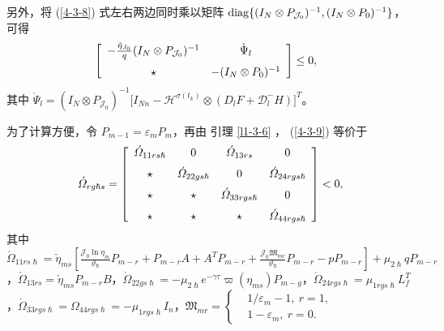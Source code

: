 另外，将 (\ref{4-3-8}) 式左右两边同时乘以矩阵 ${\rm diag}\{(I_N\otimes P_{\mathcal{J}_0})^{-1},(I_N\otimes P_0)^{-1}\}$，可得
\begin{align*}  
&\left[ \begin{array}{cc}
-\frac{\tilde{\eta}_{J_0}}{q}(I_N\otimes P_{\mathcal{J}_0})^{-1}& \grave{\Psi}_{l}\vspace{0.2cm}\\
\star&-(I_N\otimes P_0)^{-1}
\end{array}
\right]\leq0,
\end{align*}
其中
$\grave{\Psi}_{l}=  (I_N\otimes P_{\mathcal{J}_0})^{-1}[I_{Nn}- \mathcal{H}^{\sigma(t_k)} \otimes (D_{l}F+\mathscr{D}_{l}^-H)\big]^T$。

为了计算方便，令 $P_{m-1}=\varepsilon_{m}P_m$，再由 引理 \ref{l1-3-6} ， (\ref{4-3-9}) 等价于
\begin{align}\label{4-3-29} 
\acute{\varOmega}_{rg\hslash s}= \left[ \begin{array}{cccc }
\acute{\varOmega}_{11rs\hslash} &0& \acute{\varOmega}_{13rs}& 0\vspace{0.2cm}\\
\star&\acute{\varOmega}_{22gs\hslash} &0& \acute{\varOmega}_{24rgs\hslash} \vspace{0.2cm}\\
\star&\star&\acute{\varOmega}_{33rgs\hslash}&0 \vspace{0.2cm}\\
\star&\star&\star&  \acute{\varOmega}_{44rgs\hslash} \\
\end{array}
\right]< 0,
\end{align}  
其中
$
\acute{\varOmega}_{11rs\hslash}= 
 \check{\eta}_{ms}[\frac{\mathcal{J}_0 \ln \eta_m}{\vartheta_{\hslash}} P_{m-r}+P_{m-r}A+A^TP_{m-r} 
+\frac{\mathcal{J}_0\mathfrak{M}_{mr}}{\vartheta_{\hslash}}P_{m-r}-p P_{m-r}]
+\mu_{2\hslash} qP_{m-r}$，$ 
\acute{\varOmega}_{13rs}=  \check{\eta}_{ms}P_{m-r}B$，$ 
\acute{\varOmega}_{22 gs\hslash }= -\mu_{2\hslash}
e^{-\gamma\tau}\varpi(\eta_{ms})P_{m-g}$，$  
\acute{\varOmega}_{24rgs\hslash}=  \mu_{1rgs\hslash}L^T_f$，$ 
\acute{\varOmega}_{33rgs\hslash}=  \varOmega_{44rgs\hslash}= -\mu_{1rgs\hslash}I_n$，$
\mathfrak{M}_{mr} = \left\{ \begin{aligned}
&1/\varepsilon_{m}-1,\ r=1,\\
&1-\varepsilon_{m},\ r=0.\end{aligned}\right.
$

